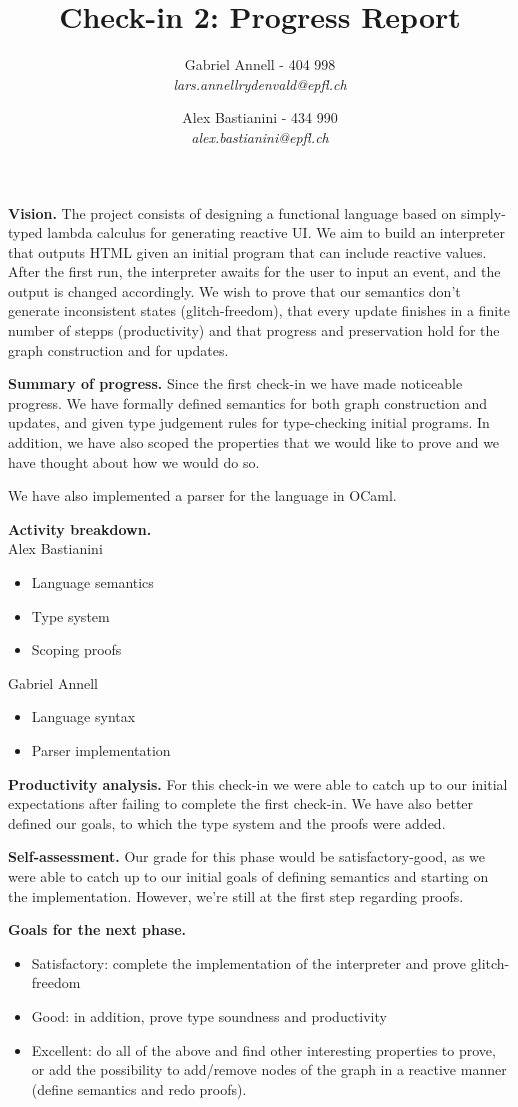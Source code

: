 \documentclass{article}
\title{
  Check-in 2: Progress Report
}
\author{
  Gabriel Annell - 404 998\\
  \small{\textit{lars.annellrydenvald@epfl.ch}} \and Alex Bastianini - 434 990\\
  \small{\textit{alex.bastianini@epfl.ch}}
}
\begin{document}
\maketitle

\medskip
\noindent\textbf{Vision.} The project consists of designing a functional language based on simply-typed lambda calculus for generating reactive UI. We aim to build an interpreter that outputs HTML given an initial program that can include reactive values. After the first run, the interpreter awaits for the user to input an event, and the output is changed accordingly. We wish to prove that our semantics don't generate inconsistent states (glitch-freedom), that every update finishes in a finite number of stepps (productivity) and that progress and preservation hold for the graph construction and for updates.

\medskip
\noindent\textbf{Summary of progress.} Since the first check-in we have made noticeable progress. We have formally defined semantics for both graph construction and updates, and given type judgement rules for type-checking initial programs. In addition, we have also scoped the properties that we would like to prove and we have thought about how we would do so.

We have also implemented a parser for the language in OCaml.

\medskip
\noindent\textbf{Activity breakdown.}\\
Alex Bastianini
\begin{itemize}
\item Language semantics
\item Type system
\item Scoping proofs
\end{itemize}

\noindent Gabriel Annell
\begin{itemize}
\item Language syntax
\item Parser implementation
\end{itemize}

\medskip
\noindent\textbf{Productivity analysis.} For this check-in we were able to catch up to our initial expectations after failing to complete the first check-in. We have also better defined our goals, to which the type system and the proofs were added.

\medskip
\noindent\textbf{Self-assessment.} Our grade for this phase would be satisfactory-good, as we were able to catch up to our initial goals of defining semantics and starting on the implementation. However, we're still at the first step regarding proofs. 

\medskip
\noindent\textbf{Goals for the next phase.}
\begin{itemize}
\item Satisfactory: complete the implementation of the interpreter and prove glitch-freedom
\item Good: in addition, prove type soundness and productivity
\item Excellent: do all of the above and find other interesting properties to prove, or add the possibility to add/remove nodes of the graph in a reactive manner (define semantics and redo proofs).
\end{itemize}
\end{document}

